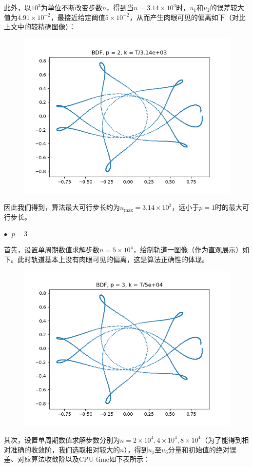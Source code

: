 \documentclass{ctexart}
\begin{document}
\begin{sloppypar}
此外，以$10^3$为单位不断改变步数$n$，得到当$n = 3.14 \times 10^3$时，$u_1$和$u_2$的误差较大值为$4.91 \times 10^{-2}$，最接近给定阈值$5 \times 10^{-2}$，从而产生肉眼可见的偏离如下（对比上文中的较精确图像）：
\begin{figure}[H]
\centering
\includegraphics[scale = 0.45]{./report_src/Figure_59.png}
\end{figure}
因此我们得到，算法最大可行步长约为$n_{\max} = 3.14 \times 10^3$，远小于$p=1$时的最大可行步长。

$\bullet \;$ $p = 3$

首先，设置单周期数值求解步数$n = 5 \times 10^4$，绘制轨道一图像（作为直观展示）如下。此时轨道基本上没有肉眼可见的偏离，这是算法正确性的体现。
\begin{figure}[H]
\centering
\includegraphics[scale = 0.45]{./report_src/Figure_60.png}
\end{figure}
其次，设置单周期数值求解步数分别为$n = 2 \times 10^4,4 \times 10^4,8 \times 10^4$（为了能得到相对准确的收敛阶，我们选取相对较大的$n$），得到$u_1$至$u_6$分量和初始值的绝对误差、对应算法收敛阶以及CPU time如下表所示：


\end{sloppypar}
\end{document}
